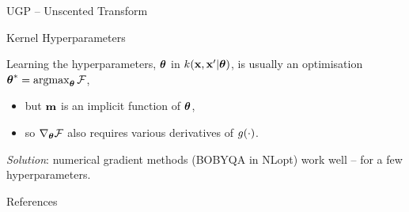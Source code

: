 \documentclass[final]{beamer}
\newlength{\onecolwid}
\begin{document}
\begin{frame}[t]
\begin{columns}[t]
\begin{column}{\onecolwid}
\begin{block}{UGP -- Unscented Transform}
\end{block}


\begin{block}{Kernel Hyperparameters}

Learning the hyperparameters, $\boldsymbol\theta$ in $k\!\left({\mathbf{x},
    \mathbf{x}'|\boldsymbol\theta}\right)$, is usually an optimisation $\boldsymbol\theta^* =
\operatorname*{\operatorname*{argmax}}_{\boldsymbol\theta}\mathcal{F}$,%
\begin{itemize}
    \item but $\mathbf{m}$ is an implicit function of $\boldsymbol\theta$,
    \item so $\nabla_{\boldsymbol\theta}\mathcal{F}$ also requires various derivatives of
        $g\!\left({{\cdot}}\right)$.
\end{itemize}
\emph{Solution}: numerical gradient methods (BOBYQA in NLopt) work well -- for
a few hyperparameters.

\end{block}






\begin{block}{References}

\small{
\vspace{0.75in}}

\end{block}






\end{column}
\end{columns}
\end{frame}
\end{document}
